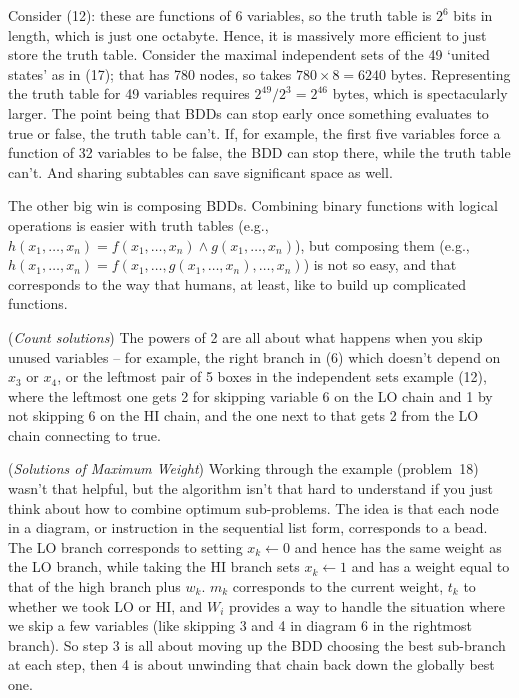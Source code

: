 Consider (12): these are functions of 6 variables, so the truth table is $2^6$ bits
in length, which is just one octabyte.  Hence, it is massively more efficient
to just store the truth table.  Consider the maximal independent sets of the
49 `united states' as in (17); that has 780 nodes, so takes $780 \times 8 = 6240$
bytes.  Representing the truth table for 49 variables requires $2^49 / 2^3 = 2^46$
bytes, which is spectacularly larger.  The point being that BDDs can stop early
once something evaluates to true or false, the truth table can't.  If, for example,
the first five variables force a function of 32 variables to be false, the BDD
can stop there, while the truth table can't.  And sharing subtables can save
significant space as well.

The other big win is composing BDDs.  Combining binary functions with
logical operations is easier with truth tables (e.g., $h\left(x_1, \ldots, x_n\right)
= f\left(x_1, \ldots, x_n\right) \land g\left(x_1, \ldots, x_n\right)$), but
composing them (e.g., $h\left(x_1, \ldots, x_n\right) = f\left(x_1, \ldots,
g\left(x_1, \ldots, x_n\right), \ldots, x_n\right)$) is not so easy, and 
that corresponds to the way that humans, at least, like to build up complicated
functions.

 ({\it Count solutions})\hfil\break
The powers of 2 are all about what happens when you skip unused
variables -- for example, the right branch in (6) which doesn't depend
on $x_3$ or $x_4$, or the leftmost pair of 5 boxes in the independent
sets example (12), where the leftmost one gets 2 for skipping variable 6
on the LO chain and 1 by not skipping 6 on the HI chain, and the one
next to that gets 2 from the LO chain connecting to true.

 ({\it Solutions of Maximum Weight})\hfil\break
Working through the example (problem~18) wasn't that helpful, but the
algorithm isn't that hard to understand if you just think about how to
combine optimum sub-problems.  The idea is that each node in a diagram,
or instruction in the sequential list form, corresponds to a bead.
The LO branch corresponds to setting $x_k \gets 0$ and hence
has the same weight as the LO branch, while taking the HI branch
sets $x_k \gets 1$ and has a weight equal to that of the high branch
plus $w_k$.  $m_k$ corresponds to the current weight, $t_k$ to
whether we took LO or HI, and $W_i$ provides a way to handle
the situation where we skip a few variables (like skipping 3 and 4
in diagram 6 in the rightmost branch).  So step 3 is all about moving up
the BDD choosing the best sub-branch at each step, then 4 is about
unwinding that chain back down the globally best one.

